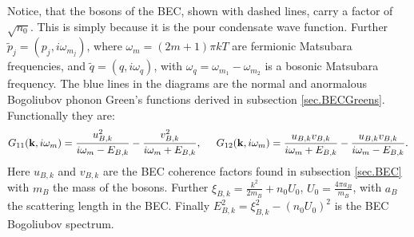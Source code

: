 Notice, that the bosons of the BEC, shown with dashed lines, carry a factor of $\sqrt{n_0}$. This is simply because it is the pour condensate wave function. Further $\tilde{p}_j = (p_j, i\omega_{m_j})$, where $\omega_{m} = (2m+1)\pi kT$ are fermionic Matsubara frequencies, and $\tilde{q} = (q, i\omega_q )$, with $\omega_q = \omega_{m_1}-\omega_{m_2}$ is a bosonic Matsubara frequency. The blue lines in the diagrams are the normal and anormalous Bogoliubov phonon Green's functions derived in subsection \ref{sec.BECGreens}. Functionally they are:
\begin{equation}
G_{11}(\mathbf{k},i\omega_m) = \frac{u_{B,k}^2}{i\omega_m-E_{B,k}}-\frac{v_{B,k}^2}{i\omega_m+E_{B,k}}, \hspace{0.5cm} G_{12}(\mathbf{k},i\omega_m) = \frac{u_{B,k}v_{B,k}}{i\omega_m+E_{B,k}}-\frac{u_{B,k}v_{B,k}}{i\omega_m-E_{B,k}}.
\end{equation}
Here $u_{B,k}$ and $v_{B,k}$ are the BEC coherence factors found in subsection \ref{sec.BEC} with $m_B$ the mass of the bosons. Further $\xi_{B,k} = \frac{k^2}{2m_B}+n_0U_0$, $U_0 = \frac{4\pi a_B}{m_B}$, with $a_B$ the scattering length in the BEC. Finally $E_{B,k}^2 = \xi_{B,k}^2-(n_0U_0)^2$ is the BEC Bogoliubov spectrum.

